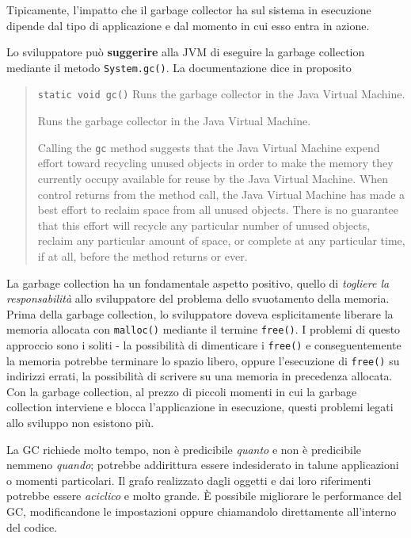 \documentclass[\fontsizeclass,twocolumn]{\classname}
\theoremstyle{definition}
\theoremstyle{definition}
\begin{document}
Tipicamente, l'impatto che il garbage collector ha sul sistema in esecuzione
dipende dal tipo di applicazione e dal momento in cui esso entra in azione.

Lo sviluppatore può \textbf{suggerire} alla JVM di eseguire la garbage
collection mediante il metodo \texttt{System.gc()}. La documentazione dice in
proposito

\begin{quote}
    \footnotesize{\texttt{static void gc()} Runs the garbage collector in the
        Java Virtual Machine.

Runs the garbage collector in the Java Virtual Machine.

Calling the \texttt{gc} method suggests that the Java Virtual Machine expend
effort toward recycling unused objects in order to make the memory they
currently occupy available for reuse by the Java Virtual Machine. When control
returns from the method call, the Java Virtual Machine has made a best effort
to reclaim space from all unused objects. There is no guarantee that this
effort will recycle any particular number of unused objects, reclaim any
particular amount of space, or complete at any particular time, if at all,
before the method returns or ever.
}
\end{quote}

La garbage collection ha un fondamentale aspetto positivo, quello di
\emph{togliere la responsabilità} allo sviluppatore del problema dello
svuotamento della memoria. Prima della garbage collection, lo sviluppatore
doveva esplicitamente liberare la memoria allocata con \texttt{malloc()}
mediante il termine \texttt{free()}. I problemi di questo approccio sono i
soliti \-- la possibilità di dimenticare i \texttt{free()} e conseguentemente
la memoria potrebbe terminare lo spazio libero, oppure l'esecuzione di
\texttt{free()} su indirizzi errati, la possibilità di scrivere su una memoria
in precedenza allocata. Con la garbage collection, al prezzo di piccoli momenti
in cui la garbage collection interviene e blocca l'applicazione in esecuzione,
questi problemi legati allo sviluppo non esistono più.

La GC richiede molto tempo, non è predicibile \emph{quanto} e non è
predicibile nemmeno \emph{quando}; potrebbe addirittura essere indesiderato in
talune applicazioni o momenti particolari. Il grafo realizzato dagli oggetti e
dai loro riferimenti potrebbe essere \emph{aciclico} e molto grande. È
possibile migliorare le performance del GC, modificandone le impostazioni
oppure chiamandolo direttamente all'interno del codice.
\end{document}
